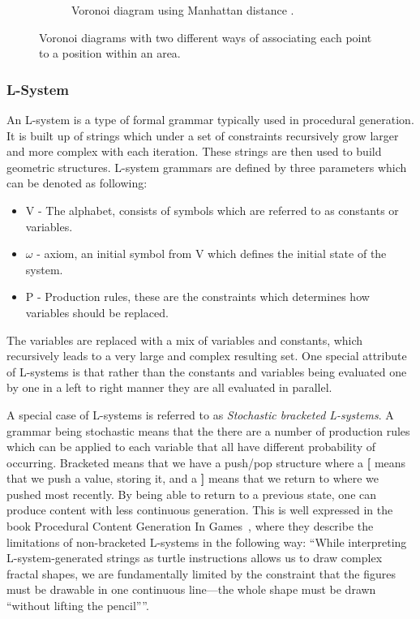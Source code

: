 \begin{figure}[H]
\begin{subfigure}[b]{0.49\textwidth}
    \caption{Voronoi diagram using Manhattan distance \cite{voronoi_diagram_manhattan}.}
    \label{fig:voronoi_manhattan}
  \end{subfigure}
  \caption{Voronoi diagrams with two different ways of associating each point to a position within an area.}
  \label{fig:voronoi}
\end{figure}

\subsubsection{L-System}
An L-system is a type of formal grammar typically used in procedural generation.
It is built up of strings which under a set of constraints recursively grow larger and more complex with each iteration.
These strings are then used to build geometric structures.
L-system grammars are defined by three parameters which can be denoted as following:

\begin{itemize}
  \item V  - The alphabet, consists of symbols which are referred to as constants or variables.
  \item $\omega$ - axiom, an initial symbol from V which defines the initial state of the system.
  \item P - Production rules, these are the constraints which determines how variables should be replaced.
\end{itemize}

The variables are replaced with a mix of variables and constants, which recursively leads to a very large and complex resulting set.
One special attribute of L-systems is that rather than the constants and variables being evaluated one by one in a left to right manner they are all evaluated in parallel.

A special case of L-systems is referred to as \textit{Stochastic bracketed L-systems}.
A grammar being stochastic means that the there are a number of production rules which can be applied to each variable that all have different probability of occurring.
Bracketed means that we have a push/pop structure where a \textbf{[} means that we push a value, storing it, and a \textbf{]} means that we return to where we pushed most recently.
By being able to return to a previous state, one can produce content with less continuous generation.
This is well expressed in the book Procedural Content Generation In Games~\cite[p.77]{PCG_in_games}, where they describe the limitations of non-bracketed L-systems in the following way:
“While interpreting L-system-generated strings as turtle instructions allows us to draw complex fractal shapes, we are fundamentally limited by the constraint that the figures must be drawable in one continuous line—the whole shape must be drawn “without lifting the pencil””. 

